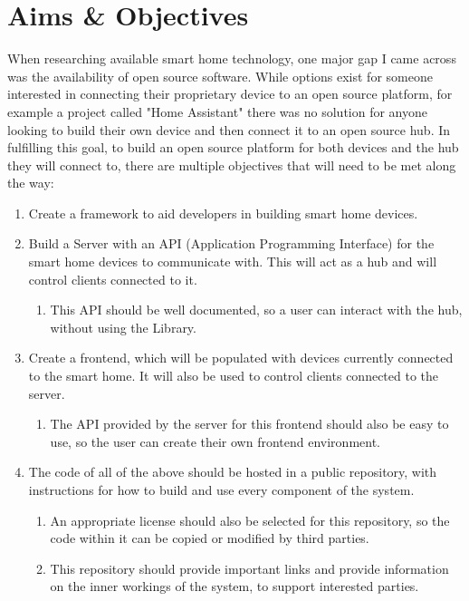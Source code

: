 \section{Aims \& Objectives} \label{sec:intro:aims}
When researching available smart home technology, one major gap I came across 
was the availability of open source software. While options exist for someone 
interested in connecting their proprietary device to an open source platform, for example a project called "Home Assistant" there was no solution for anyone looking to 
build their own device and then connect it to an open source hub. In fulfilling 
this goal, to build an open source platform for both devices and the hub they 
will connect to, there are multiple objectives that will need to be met along 
the way:
\begin{enumerate}
    \item Create a framework to aid developers in building smart home devices.
    \item Build a Server with an API (Application Programming Interface) for the smart home devices to communicate 
        with. This will act as a hub and will control clients connected to it.
         \begin{enumerate}
             \item This API should be well documented, so a user can interact 
                 with the hub, without using the Library.
         \end{enumerate}
     \item Create a frontend, which will be populated with devices currently 
         connected to the smart home. It will also be used to control clients 
         connected to the server.
         \begin{enumerate}
             \item The API provided by the server for this frontend should also 
                 be easy to use, so the user can create their own frontend 
                 environment.
         \end{enumerate}
     \item The code of all of the above should be hosted in a public repository, 
         with instructions for how to build and use every component of the 
         system.
         \begin{enumerate}
             \item An appropriate license should also be selected for this 
                 repository, so the code within it can be copied or modified by 
                 third parties.
             \item This repository should provide important links and provide 
                 information on the inner workings of the system, to support 
                 interested parties.
         \end{enumerate}
\end{enumerate}
    

